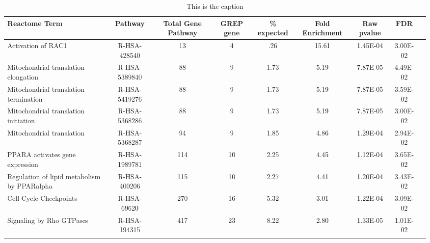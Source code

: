 
\begin{table}[ht]
\centering
\begin{adjustbox}{width=1\textwidth}
\small
\begin{tabular}{ l c c c c c c c c}
 \hline
 Reactome Term & Pathway	& Total Gene Pathway &	GREP gene & \% expected & Fold Enrichment	& Raw pvalue & FDR \\ [0.5ex]
 \hline
 Activation of RAC1 & R-HSA-428540 &	13	& 4	& .26 & 15.61	& 1.45E-04	& 3.00E-02 \\
 Mitochondrial translation elongation & R-HSA-5389840 &	88	& 9	& 1.73 &	5.19	& 7.87E-05	& 4.49E-02 \\
 Mitochondrial translation termination & R-HSA-5419276 &	88	& 9	& 1.73	& 5.19 &	7.87E-05	& 3.59E-02 \\
 Mitochondrial translation initiation & R-HSA-5368286 &	88	& 9	& 1.73 & 5.19 & 7.87E-05	& 3.00E-02 \\
 Mitochondrial translation & R-HSA-5368287 &	94	& 9	 &1.85 &	4.86	& 1.29E-04	& 2.94E-02 \\
 PPARA activates gene expression & R-HSA-1989781 & 114 &	10 &	2.25 & 4.45	& 1.12E-04	& 3.65E-02 \\
 Regulation of lipid metabolism by PPARalpha & R-HSA-400206 &	115	& 10	& 2.27 & 4.41	& 1.20E-04 & 3.43E-02 \\
 Cell Cycle Checkpoints & R-HSA-69620 &	270 & 16 & 5.32	& 3.01 &	1.22E-04 &	3.09E-02 \\
 Signaling by Rho GTPases & R-HSA-194315 & 417	& 23	& 8.22 &	2.80	& 1.33E-05 & 1.01E-02 \\
\caption{This is the caption }
\label{tab:rectomepathways}
\end{tabular}
\end{adjustbox}

\end{table}



